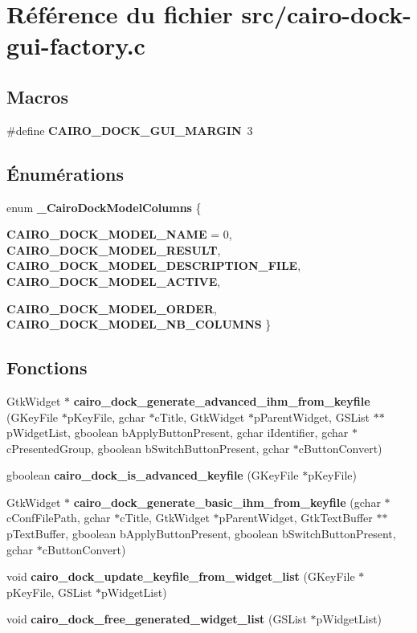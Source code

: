\section{R\'{e}f\'{e}rence du fichier src/cairo-dock-gui-factory.c}
\label{cairo-dock-gui-factory_8c}
\subsection*{Macros}
\begin{CompactItemize}
\item 
\#define {\bf CAIRO\_\-DOCK\_\-GUI\_\-MARGIN}~3
\end{CompactItemize}
\subsection*{\'{E}num\'{e}rations}
\begin{CompactItemize}
\item 
enum {\bf \_\-Cairo\-Dock\-Model\-Columns} \{ \par
{\bf CAIRO\_\-DOCK\_\-MODEL\_\-NAME} =  0, 
{\bf CAIRO\_\-DOCK\_\-MODEL\_\-RESULT}, 
{\bf CAIRO\_\-DOCK\_\-MODEL\_\-DESCRIPTION\_\-FILE}, 
{\bf CAIRO\_\-DOCK\_\-MODEL\_\-ACTIVE}, 
\par
{\bf CAIRO\_\-DOCK\_\-MODEL\_\-ORDER}, 
{\bf CAIRO\_\-DOCK\_\-MODEL\_\-NB\_\-COLUMNS}
 \}
\end{CompactItemize}
\subsection*{Fonctions}
\begin{CompactItemize}
\item 
Gtk\-Widget $\ast$ {\bf cairo\_\-dock\_\-generate\_\-advanced\_\-ihm\_\-from\_\-keyfile} (GKey\-File $\ast$p\-Key\-File, gchar $\ast$c\-Title, Gtk\-Widget $\ast$p\-Parent\-Widget, GSList $\ast$$\ast$p\-Widget\-List, gboolean b\-Apply\-Button\-Present, gchar i\-Identifier, gchar $\ast$c\-Presented\-Group, gboolean b\-Switch\-Button\-Present, gchar $\ast$c\-Button\-Convert)
\item 
gboolean {\bf cairo\_\-dock\_\-is\_\-advanced\_\-keyfile} (GKey\-File $\ast$p\-Key\-File)
\item 
Gtk\-Widget $\ast$ {\bf cairo\_\-dock\_\-generate\_\-basic\_\-ihm\_\-from\_\-keyfile} (gchar $\ast$c\-Conf\-File\-Path, gchar $\ast$c\-Title, Gtk\-Widget $\ast$p\-Parent\-Widget, Gtk\-Text\-Buffer $\ast$$\ast$p\-Text\-Buffer, gboolean b\-Apply\-Button\-Present, gboolean b\-Switch\-Button\-Present, gchar $\ast$c\-Button\-Convert)
\item 
void {\bf cairo\_\-dock\_\-update\_\-keyfile\_\-from\_\-widget\_\-list} (GKey\-File $\ast$p\-Key\-File, GSList $\ast$p\-Widget\-List)
\item 
void {\bf cairo\_\-dock\_\-free\_\-generated\_\-widget\_\-list} (GSList $\ast$p\-Widget\-List)
\end{CompactItemize}


